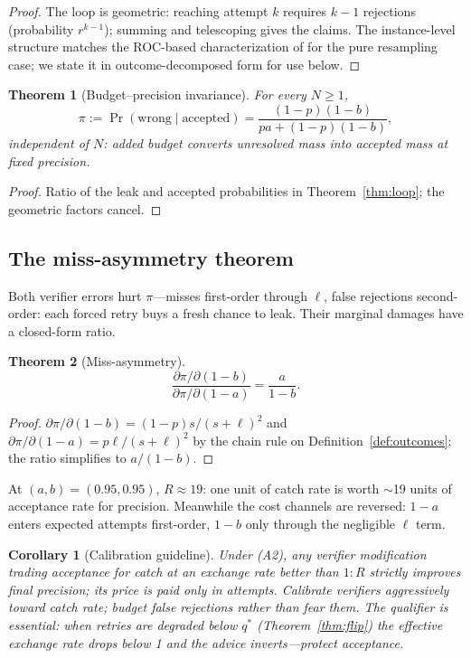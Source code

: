 \documentclass[11pt]{article}
\newtheorem{theorem}{Theorem}
\newtheorem{corollary}{Corollary}
\begin{document}
\begin{proof}
The loop is geometric: reaching attempt $k$ requires $k-1$
rejections (probability $r^{k-1}$); summing and telescoping gives
the claims.  The instance-level structure matches the ROC-based
characterization of \citet{dorner2026rocnreroll} for the pure
resampling case; we state it in outcome-decomposed form for use
below.
\end{proof}

\begin{theorem}[Budget--precision invariance]\label{thm:invariance}
For every $N\ge1$,
\[
\pi := \Pr(\text{wrong} \mid \text{accepted})
= \frac{(1-p)(1-b)}{pa + (1-p)(1-b)},
\]
independent of $N$: added budget converts unresolved mass into
accepted mass \emph{at fixed precision}.
\end{theorem}

\begin{proof}
Ratio of the leak and accepted probabilities in
Theorem~\ref{thm:loop}; the geometric factors cancel.
\end{proof}

\subsection{The miss-asymmetry theorem}\label{sec:asym}

Both verifier errors hurt $\pi$---misses first-order through $\ell$,
false rejections second-order: each forced retry buys a fresh chance
to leak.  Their marginal damages have a closed-form ratio.

\begin{theorem}[Miss-asymmetry]\label{thm:asym}
\[
\frac{\partial \pi / \partial (1-b)}{\partial \pi / \partial (1-a)}
= \frac{a}{1-b}.
\]
\end{theorem}

\begin{proof}
$\partial\pi/\partial(1-b) = (1-p)s/(s+\ell)^2$ and
$\partial\pi/\partial(1-a) = p\ell/(s+\ell)^2$ by the chain rule on
Definition~\ref{def:outcomes}; the ratio simplifies to $a/(1-b)$.
\end{proof}

At $(a,b)=(0.95,0.95)$, $R \approx 19$: one unit of catch rate is
worth $\sim$19 units of acceptance rate for precision.  Meanwhile
the cost channels are reversed: $1-a$ enters expected attempts
first-order, $1-b$ only through the negligible $\ell$ term.

\begin{corollary}[Calibration guideline]\label{cor:calibrate}
Under (A2), any verifier modification trading acceptance for catch
at an exchange rate better than $1{:}R$ strictly improves final
precision; its price is paid only in attempts.  Calibrate verifiers
aggressively toward catch rate; budget false rejections rather than
fear them.  The qualifier is essential: when retries are degraded
below $q^\ast$ (Theorem~\ref{thm:flip}) the effective exchange rate
drops below 1 and the advice inverts---protect acceptance.
\end{corollary}
\end{document}
